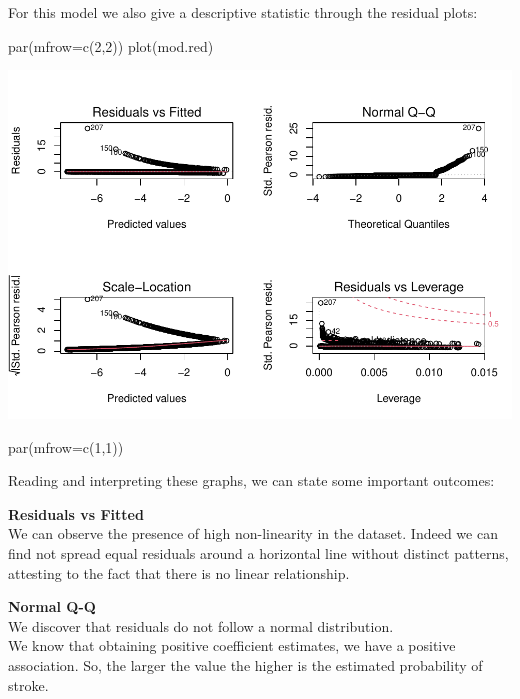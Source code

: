 \documentclass[
]{article}
\newenvironment{Shaded}{\begin{snugshade}}{\end{snugshade}}
\newcommand{\AttributeTok}[1]{\textcolor[rgb]{0.77,0.63,0.00}{#1}}
\newcommand{\DecValTok}[1]{\textcolor[rgb]{0.00,0.00,0.81}{#1}}
\newcommand{\FunctionTok}[1]{\textcolor[rgb]{0.00,0.00,0.00}{#1}}
\newcommand{\NormalTok}[1]{#1}
\begin{document}
For this model we also give a descriptive statistic through the residual
plots:

\begin{Shaded}
\begin{Highlighting}[]
\FunctionTok{par}\NormalTok{(}\AttributeTok{mfrow=}\FunctionTok{c}\NormalTok{(}\DecValTok{2}\NormalTok{,}\DecValTok{2}\NormalTok{))}
\FunctionTok{plot}\NormalTok{(mod.red)}
\end{Highlighting}
\end{Shaded}

\includegraphics{stat-project-stroke_files/figure-latex/unnamed-chunk-17-1.pdf}

\begin{Shaded}
\begin{Highlighting}[]
\FunctionTok{par}\NormalTok{(}\AttributeTok{mfrow=}\FunctionTok{c}\NormalTok{(}\DecValTok{1}\NormalTok{,}\DecValTok{1}\NormalTok{))}
\end{Highlighting}
\end{Shaded}

Reading and interpreting these graphs, we can state some important
outcomes:

\textbf{Residuals vs Fitted}\\
We can observe the presence of high non-linearity in the dataset. Indeed
we can find not spread equal residuals around a horizontal line without
distinct patterns, attesting to the fact that there is no linear
relationship.

\textbf{Normal Q-Q}\\
We discover that residuals do not follow a normal distribution.\\
We know that obtaining positive coefficient estimates, we have a
positive association. So, the larger the value the higher is the
estimated probability of stroke.
\end{document}
